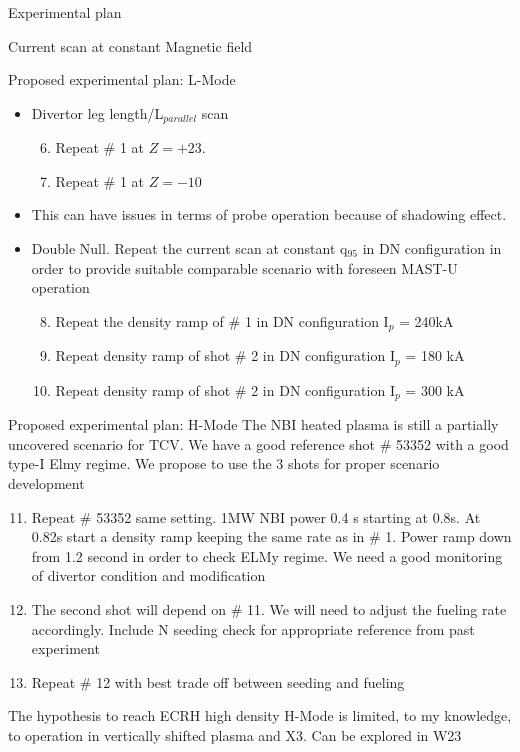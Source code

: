 \documentclass[10pt, compress]{beamer}
\begin{document}
\begin{frame}{Experimental plan}
\begin{frame}{Current scan at constant Magnetic field}
  \begin{frame}{Proposed experimental plan: L-Mode}
    \begin{itemize}
      \item Divertor leg length/L$_{parallel}$ scan
      \begin{enumerate}
        \setcounter{enumi}{5}
      \item Repeat \# 1 at $Z=+23$.
      \item Repeat \# 1 at $Z=-10$  
      \end{enumerate}
      \item This can have issues in terms of probe operation because
        of shadowing effect. 
      \item Double Null. Repeat the current scan at constant q$_{95}$ in
        DN configuration in order to provide suitable comparable
        scenario with foreseen MAST-U operation
        \begin{enumerate}
          \setcounter{enumi}{7}
          \item Repeat the density ramp of \# 1 in DN configuration
            I$_p$ = 240kA
          \item Repeat density ramp of shot \# 2 in DN configuration
            I$_p$ = 180 kA
          \item Repeat density ramp of shot \# 2 in DN configuration
            I$_p$ = 300 kA
          \end{enumerate}
        \end{itemize}
      \end{frame}

      \begin{frame}{Proposed experimental plan: H-Mode}
        The NBI heated plasma is still a partially uncovered scenario
        for TCV. We have a good reference shot \# 53352 with a good
        type-I Elmy regime. We propose to use the 3 shots for proper
        scenario development
        \begin{enumerate}
          \setcounter{enumi}{10}
          \item Repeat \# 53352 same setting. 1MW NBI power 0.4
            s starting at 0.8s. At 0.82s start a density ramp keeping
            the same rate as in \# 1. Power ramp down from 1.2 second
            in order to check ELMy regime. \alert{We need a good
              monitoring of divertor condition and modification}
          \item The second shot will depend on \# 11. We will need to
            adjust the fueling rate accordingly. Include N seeding
            \alert{check for appropriate reference from past
              experiment}
          \item Repeat \# 12 with best trade off between seeding and fueling
          \end{enumerate}
          The hypothesis to reach ECRH high density H-Mode is limited, to my
          knowledge, to operation in vertically shifted plasma and
          X3. Can be explored in W23
        \end{frame}


\end{frame}
\end{frame}
\end{document}
